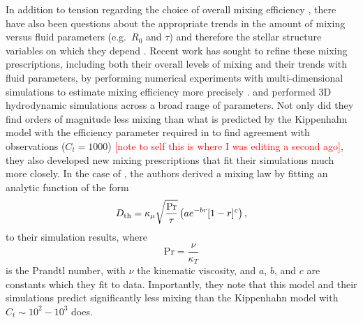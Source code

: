 In addition to tension regarding the choice of overall mixing efficiency \citep[see e.g.][for further discussion]{Ulrich1972, kippenhahn_etal_1980, charbonnel_thermohaline_2007, CantielloLanger2010}, there have also been questions about the appropriate trends in the amount of mixing versus fluid parameters (e.g.~$R_0$ and $\tau$) and therefore the stellar structure variables on which they depend \citep{garaud_DDC_review_2018}.
Recent work has sought to refine these mixing prescriptions, including both their overall levels of mixing and their trends with fluid parameters, by performing numerical experiments with multi-dimensional simulations to estimate mixing efficiency more precisely \citep{Denissenkov2010thermohaline,traxler_etal_2011}. 
\citet{traxler_etal_2011} and \citet{brown_etal_2013} performed 3D hydrodynamic simulations across a broad range of parameters. %
Not only did they find orders of magnitude less mixing than what is predicted by the Kippenhahn model with the efficiency parameter required in \citet{charbonnel_thermohaline_2007} to find agreement with observations ($C_t = 1000$) \textcolor{red}{[note to self this is where I was editing a second ago]}, they also developed new mixing prescriptions that fit their simulations much more closely. 
In the case of \citet{traxler_etal_2011}, the authors derived a mixing law by fitting an
analytic function 
of the form
\begin{equation} \label{eqn:trax_model}
   \Dth = \kappa_{\mu}\sqrt{\frac{\mathrm{Pr}}{\tau}}\left(a e^{-br}[1 - r]^c\right),
\end{equation}
to their simulation results,
where 
\begin{equation} \label{eq:Prandtl}
    \mathrm{Pr} = \frac{\nu}{\kappa_T}
\end{equation}
is the Prandtl number, with $\nu$ the kinematic viscosity,
%
and $a$, $b$, and $c$ are constants which they fit to data. 
Importantly, they note that this model and their simulations predict significantly less mixing than the Kippenhahn model with $C_t \sim 10^2 - 10^3$ does.

